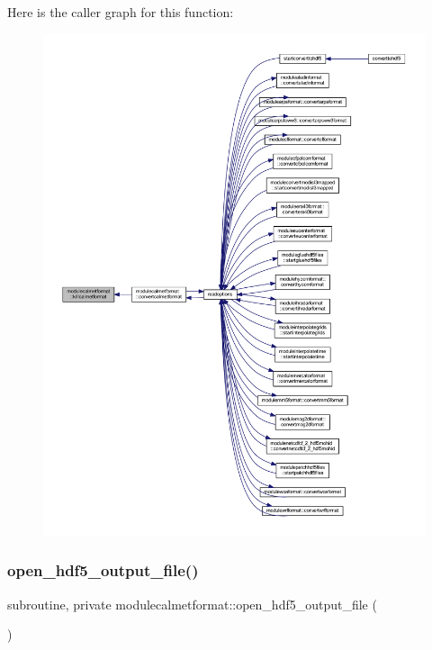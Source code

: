 Here is the caller graph for this function\+:\nopagebreak
\begin{figure}[H]
\begin{center}
\leavevmode
\includegraphics[width=350pt]{namespacemodulecalmetformat_a7703da81b5a94320621a668c0326f881_icgraph}
\end{center}
\end{figure}
\mbox{\label{namespacemodulecalmetformat_a08504fdf416abe46eab39f11e6104b74}} 
\subsubsection{\texorpdfstring{open\+\_\+hdf5\+\_\+output\+\_\+file()}{open\_hdf5\_output\_file()}}
{\footnotesize\ttfamily subroutine, private modulecalmetformat\+::open\+\_\+hdf5\+\_\+output\+\_\+file (\begin{DoxyParamCaption}{ }\end{DoxyParamCaption})\hspace{0.3cm}{\ttfamily [private]}}


